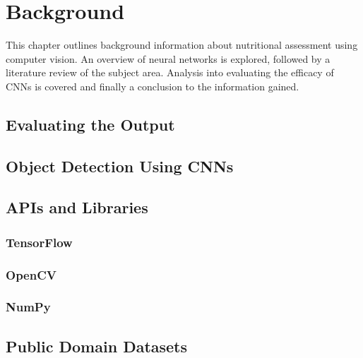 \chapter{Background}
\label{background}

This chapter outlines background information about nutritional assessment using computer vision.
An overview of neural networks is explored, followed by a literature review of the subject area.
Analysis into evaluating the efficacy of CNNs is covered and finally a conclusion to the information gained.











\section{Evaluating the Output}




\section{Object Detection Using CNNs}


\section{APIs and Libraries}
\tocless\subsection{TensorFlow}


\tocless\subsection{OpenCV}


\tocless\subsection{NumPy}


\section{Public Domain Datasets}


